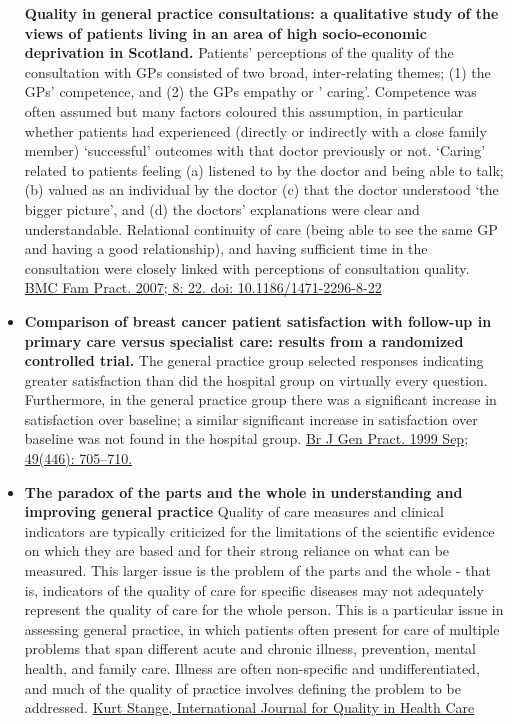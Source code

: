 \documentclass[]{book}
\begin{document}
\begin{itemize}
  \textbf{Quality in general practice consultations: a qualitative study of the views of patients living in an area of high socio-economic deprivation in Scotland.} Patients' perceptions of the quality of the consultation with GPs consisted of two broad, inter-relating themes; (1) the GPs' competence, and (2) the GPs empathy or ' caring'. Competence was often assumed but many factors coloured this assumption, in particular whether patients had experienced (directly or indirectly with a close family member) `successful' outcomes with that doctor previously or not. `Caring' related to patients feeling (a) listened to by the doctor and being able to talk; (b) valued as an individual by the doctor (c) that the doctor understood `the bigger picture', and (d) the doctors' explanations were clear and understandable. Relational continuity of care (being able to see the same GP and having a good relationship), and having sufficient time in the consultation were closely linked with perceptions of consultation quality. \href{https://www.ncbi.nlm.nih.gov/pmc/articles/PMC1857696/}{BMC Fam Pract. 2007; 8: 22. doi: 10.1186/1471-2296-8-22}
\item
  \textbf{Comparison of breast cancer patient satisfaction with follow-up in primary care versus specialist care: results from a randomized controlled trial.} The general practice group selected responses indicating greater satisfaction than did the hospital group on virtually every question. Furthermore, in the general practice group there was a significant increase in satisfaction over baseline; a similar significant increase in satisfaction over baseline was not found in the hospital group. \href{https://www.ncbi.nlm.nih.gov/pmc/articles/PMC1313497/}{Br J Gen Pract. 1999 Sep; 49(446): 705--710.}
\item
  \textbf{The paradox of the parts and the whole in understanding and improving general practice} Quality of care measures and clinical indicators are typically criticized for the limitations of the scientific evidence on which they are based and for their strong reliance on what can be measured. This larger issue is the problem of the parts and the whole - that is, indicators of the quality of care for specific diseases may not adequately represent the quality of care for the whole person. This is a particular issue in assessing general practice, in which patients often present for care of multiple problems that span different acute and chronic illness, prevention, mental health, and family care. Illness are often non-specific and undifferentiated, and much of the quality of practice involves defining the problem to be addressed. \href{https://sci-hub.tw/10.1093/intqhc/14.4.267}{Kurt Stange, International Journal for Quality in Health Care}

\end{itemize}
\end{document}
